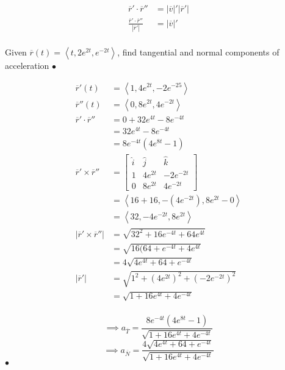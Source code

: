 \begin{align*}
	\overline{r}' \cdot \overline{r}'' &=  \left| \overline{v} \right|' \left| \overline{r}' \right|  \\
	\frac{\overline{r}' \cdot \overline{r}''}{\left| \overline{r}' \right| } &= \left| \overline{v} \right| ' \\
\end{align*}



\begin{example}
	Given $\overline{r}(t) = \left<t, 2e^{2t}, e^{-2t} \right>$, find tangential and normal components
	of acceleration
\smallskip\hfill$\bullet$\end{example}

\begin{solution}
	\begin{align*}
		\overline{r}'(t) &=  \left<1, 4e^{2t}, -2e^{-25} \right>\\
		\overline{r}''(t) &=  \left< 0, 8e^{2t}, 4e^{-2t} \right> \\
		\overline{r}' \cdot \overline{r}'' &= 0 + 32 e^{4t} - 8e^{-4t} \\
		&= 32 e^{4t }- 8e^{-4t} \\
		&= 8e^{-4t}\left( 4e^{8t}-1 \right)  \\
		\overline{r}' \times \overline{r}'' &= \begin{bmatrix} \hat{i} & \hat{j} & \hat{k} \\ 1 & 4e^{2t} & -2e^{-2t} \\
		0 & 8e^{2t} & 4e^{-2t}\end{bmatrix}  \\
		  &= \left<16 +16, -(4e^{-2t}), 8e^{2t}-0 \right> \\
		  &= \left<32, -4e^{-2t}, 8e^{2t} \right> \\
		  \left| \overline{r}' \times  \overline{r} ''  \right| &= \sqrt{32^2 + 16e^{-4t} + 64e^{4t}}  \\
		  &=  \sqrt{16(64 + e^{-4t} + 4e^{4t}}\\
		  &= 4 \sqrt{4e^{4t} + 64 + e^{-4t}}  \\
		  \left| \overline{r}' \right| &= \sqrt{1^2 + (4e^{2t})^2 + (-2e^{-2t})^2}  \\
		  &= \sqrt{1 + 16e^{4t}+ 4e^{-4t}}  \\
	\end{align*}

	\[\implies a_{\overline{T}}= \frac{  8 e^{-4t}(4e^{8t}-1) }{\sqrt{1 + 16e^{4t} + 4e^{-4t}} }\]
	\[\implies a_{\overline{N}}= \frac{4\sqrt{4e^{4t}+64 + e^{-4t}} }{\sqrt{1 + 16e^{4t} + 4e^{-4t}} }\]
\smallskip\hfill$\bullet$\end{solution}

\newpage


